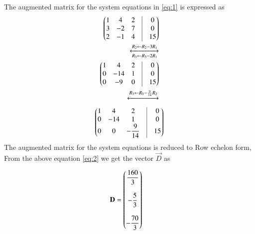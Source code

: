 \documentclass[journal,12pt,twocolumn]{IEEEtran}
\begin{document}
\begin{enumerate}
The augmented matrix for the system equations in \ref{eq:1} is expressed as
\begin{align}
	\myvec{1&4&2&\vrule&0\\ 3&-2&7&\vrule&0 \\ 2&-1&4&\vrule&15} \\
	\xleftrightarrow[R_3\leftarrow R_3-2R_1]{R_2\leftarrow R_2-3R_1}\\
	\myvec{1&4&2&\vrule&0\\ 0&-14&1&\vrule&0 \\ 0&-9&0&\vrule&15}\\
	\xleftrightarrow[]{R_3\leftarrow R_3-\frac{9}{14}R_2}
\end{align}
\begin{align}
	\label{eq:2}
	\myvec{1&4&2&\vrule&0\\ 0&-14&1&\vrule&0 \\ 0&0&-\dfrac{9}{14}&\vrule&15}
\end{align}
The augmented matrix for the system equations is reduced to Row echelon form, From the above equation \ref{eq:2} we get the vector $\vec{D}$ as

\begin{align}
\mathbf{D} &= \begin{pmatrix}\dfrac{160}{3}\\\\ -\dfrac{5}{3}\\\\-\dfrac{70}{3}\end{pmatrix}
\end{align}

\end{enumerate}
\end{document}
